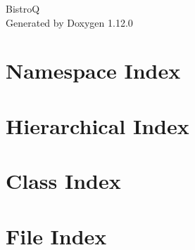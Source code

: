 \documentclass[twoside]{book}
\newcommand{\+}{\discretionary{\mbox{\scriptsize$\hookleftarrow$}}{}{}}
\newcommand{\clearemptydoublepage}{%
    \newpage{\pagestyle{empty}\cleardoublepage}%
  }
\begin{document}
  \raggedbottom
    \hypersetup{pageanchor=false,
                bookmarksnumbered=true,
                pdfencoding=unicode
               }
  \begin{titlepage}
  \vspace*{7cm}
  \begin{center}%
  {\Large BistroQ}\\
  \vspace*{1cm}
  {\large Generated by Doxygen 1.12.0}\\
  \end{center}
  \end{titlepage}
  \clearemptydoublepage
  \tableofcontents
  \clearemptydoublepage
  \hypersetup{pageanchor=true}

\chapter{Namespace Index}

\chapter{Hierarchical Index}

\chapter{Class Index}

\chapter{File Index}

\end{document}
